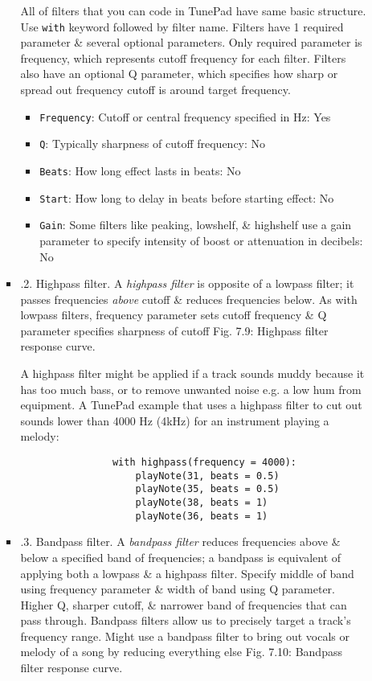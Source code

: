 \documentclass{article}
\begin{document}
\begin{itemize}
\begin{itemize}
\begin{itemize}
			All of filters that you can code in TunePad have same basic structure. Use {\tt with} keyword followed by filter name. Filters have 1 required parameter \& several optional parameters. Only required parameter is frequency, which represents cutoff frequency for each filter. Filters also have an optional Q parameter, which specifies how sharp or spread out frequency cutoff is around target frequency.
			
			{}
			\begin{itemize}
				\item {\tt Frequency}: Cutoff or central frequency specified in Hz: Yes
				\item {\tt Q}: Typically sharpness of cutoff frequency: No
				\item {\tt Beats}: How long effect lasts in beats: No
				\item {\tt Start}: How long to delay in beats before starting effect: No
				\item {\tt Gain}: Some filters like peaking, lowshelf, \& highshelf use a gain parameter to specify intensity of boost or attenuation in decibels: No
			\end{itemize}
			\item {.2. Highpass filter.} A {\it highpass filter} is opposite of a lowpass filter; it passes frequencies {\it above} cutoff \& reduces frequencies below. As with lowpass filters, frequency parameter sets cutoff frequency \& Q parameter specifies sharpness of cutoff {\sf Fig. 7.9: Highpass filter response curve.}
			
			A highpass filter might be applied if a track sounds muddy because it has too much bass, or to remove unwanted noise e.g. a low hum from equipment. A TunePad example that uses a highpass filter to cut out sounds lower than 4000 Hz (4kHz) for an instrument playing a melody:
			\begin{verbatim}
				with highpass(frequency = 4000):
				    playNote(31, beats = 0.5)
				    playNote(35, beats = 0.5)
				    playNote(38, beats = 1)
				    playNote(36, beats = 1)
			\end{verbatim}
			\item {.3. Bandpass filter.} A {\it bandpass filter} reduces frequencies above \& below a specified band of frequencies; a bandpass is equivalent of applying both a lowpass \& a highpass filter. Specify middle of band using frequency parameter \& width of band using Q parameter. Higher Q, sharper cutoff, \& narrower band of frequencies that can pass through. Bandpass filters allow us to precisely target a track's frequency range. Might use a bandpass filter to bring out vocals or melody of a song by reducing everything else {\sf Fig. 7.10: Bandpass filter response curve.}
			

\end{itemize}
\end{itemize}
\end{itemize}
\end{document}
